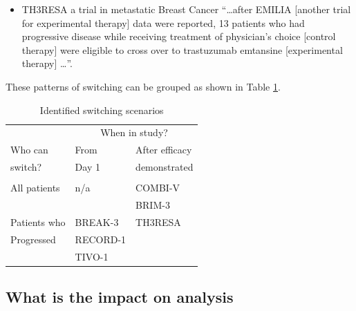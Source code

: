 \begin{itemize}

\item TH3RESA a trial in metastatic Breast Cancer ``\ldots after EMILIA [another trial for experimental therapy] data were reported, 13 patients who had progressive disease while receiving treatment of physician's choice [control therapy] were eligible to cross over to trastuzumab emtansine [experimental therapy] \ldots ''. \citep{TH3RESA}

\end{itemize}

These patterns of switching can be grouped as shown in Table \ref{T:chap_intro:switch}. 
\begin{table}[ht] 
\caption{Identified switching scenarios}
\centering 
\begin{tabular}{ l  l l  }
\hline
\hline

 & \multicolumn{2}{c}{When in study?}  \\
Who can                 & From  & After efficacy   \\
switch?                 & Day 1 & demonstrated     \\ 
\hline\\[0.3cm]
All patients            & n/a   &  COMBI-V \\
                        &       & BRIM-3           \\[0.3cm]
           
Patients who &  BREAK-3  & TH3RESA          \\ 
Progressed   & RECORD-1  &                   \\
             & TIVO-1    &                    \\
\hline             
\end{tabular} 
\label{T:chap_intro:switch}
\end{table}

\subsection{What is the impact on analysis}

